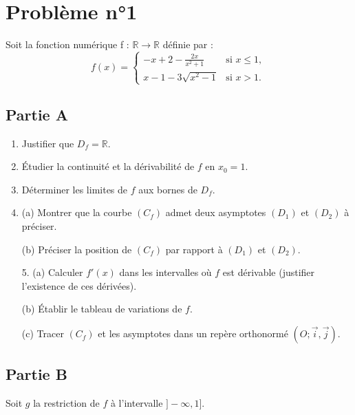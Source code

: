 \documentclass[12pt]{article}
\begin{document}
\section*{Problème n°1}

Soit la fonction numérique  f : $\mathbb{R} \to \mathbb{R}$  définie par :
\[
f(x) =
\begin{cases}
-x + 2 - \frac{2x}{x^2 + 1} & \text{si } x \leq 1, \\
x - 1 - 3\sqrt{x^2 - 1} & \text{si } x > 1.
\end{cases}
\]

\subsection*{Partie A}

\begin{enumerate}
    \item Justifier que $D_f = \mathbb{R}$.
    \item Étudier la continuité et la dérivabilité de $f$ en $x_0 = 1$.
    \item Déterminer les limites de $f$ aux bornes de $D_f$.
    \item (a) Montrer que la courbe $(C_f)$ admet deux asymptotes $(D_1)$ et $(D_2)$ à préciser.
\end{enumerate}
\begin{enumerate}
    \item[(b)] Préciser la position de \( (C_f) \) par rapport à \( (D_1) \) et \( (D_2) \).
\end{enumerate}

\begin{enumerate}
    \item[5.] (a) Calculer \( f'(x) \) dans les intervalles où \( f \) est dérivable (justifier l’existence de ces dérivées).
    \item[(b)] Établir le tableau de variations de \( f \).
    \item[(c)] Tracer \( (C_f) \) et les asymptotes dans un repère orthonormé \( (O; \vec{i}, \vec{j}) \).
\end{enumerate}
\subsection*{Partie B}

Soit \( g \) la restriction de \( f \) à l’intervalle \( ] -\infty, 1] \).
\end{document}
